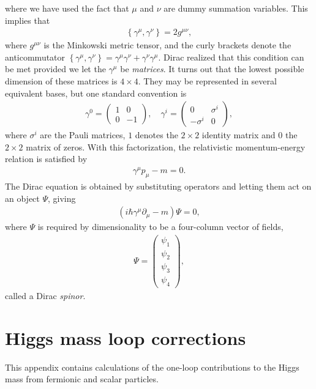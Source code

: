 \documentclass[twoside,english]{uiofysmaster}
\begin{document}
where we have used the fact that $\mu$ and $\nu$ are dummy summation variables. This implies that
\begin{align}
	\left\{ \gamma^\mu, \gamma^\nu \right\} = 2g^{\mu\nu},
\end{align}
where $g^{\mu\nu}$ is the Minkowski metric tensor, and the curly brackets denote the anticommutator $\left\{ \gamma^\mu, \gamma^\nu \right\} = \gamma^\mu \gamma^\nu + \gamma^\nu \gamma^\mu$. Dirac realized that this condition can be met provided we let the $\gamma^\mu$ be {\it matrices}. It turns out that the lowest possible dimension of these matrices is $4\times 4$. They may be represented in several equivalent bases, but one standard convention is
\begin{align}
	\gamma^0 = \begin{pmatrix}
		1 & 0 \\ 0 & -1
	\end{pmatrix}, \quad{} \gamma^i = \begin{pmatrix}
		0 & \sigma^i \\ -\sigma^i & 0
	\end{pmatrix},
\end{align}
where $\sigma^i$ are the Pauli matrices, $1$ denotes the $2\times 2$ identity matrix and $0$ the $2\times 2$ matrix of zeros. With this factorization, the relativistic momentum-energy relation is satisfied by
\begin{align}
	\gamma^\mu p_\mu - m = 0.
\end{align}
The Dirac equation is obtained by substituting operators and letting them act on an object $\Psi$, giving
\begin{align}
	\left(i\hbar \gamma^\mu \partial_\mu - m\right)\Psi = 0,
\end{align}
where $\Psi$ is required by dimensionality to be a four-column vector of fields,
\begin{align}
	\Psi = \begin{pmatrix}
		\psi_1 \\ \psi_2 \\ \psi_3 \\ \psi_4
	\end{pmatrix},
\end{align}
called a Dirac {\it spinor}.





\chapter{Higgs mass loop corrections}
\label{appendix:higgs_mass_loop_correction}
This appendix contains calculations of the one-loop contributions to the Higgs mass from fermionic and scalar particles.
\end{document}
